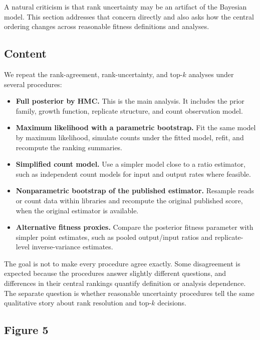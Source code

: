 \documentclass[11pt]{article}
\begin{document}
A natural criticism is that rank uncertainty may be an artifact of the Bayesian model. This section addresses that concern directly and also asks how the central ordering changes across reasonable fitness definitions and analyses.

\subsection*{Content}

We repeat the rank-agreement, rank-uncertainty, and top-$k$ analyses under several procedures:
\begin{itemize}
  \item \textbf{Full posterior by HMC.} This is the main analysis. It includes the prior family, growth function, replicate structure, and count observation model.
  \item \textbf{Maximum likelihood with a parametric bootstrap.} Fit the same model by maximum likelihood, simulate counts under the fitted model, refit, and recompute the ranking summaries.
  \item \textbf{Simplified count model.} Use a simpler model close to a ratio estimator, such as independent count models for input and output rates where feasible.
  \item \textbf{Nonparametric bootstrap of the published estimator.} Resample reads or count data within libraries and recompute the original published score, when the original estimator is available.
  \item \textbf{Alternative fitness proxies.} Compare the posterior fitness parameter with simpler point estimates, such as pooled output/input ratios and replicate-level inverse-variance estimates.
\end{itemize}

The goal is not to make every procedure agree exactly. Some disagreement is expected because the procedures answer slightly different questions, and differences in their central rankings quantify definition or analysis dependence. The separate question is whether reasonable uncertainty procedures tell the same qualitative story about rank resolution and top-$k$ decisions.

\subsection*{Figure 5}
\end{document}
